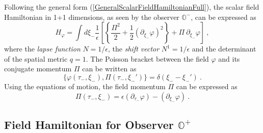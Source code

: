\documentclass[aps,12pt,showpacs]{revtex4-2}
\def\observerminus{\mathbb{O}^{-}}
\def\observerplus{\mathbb{O}^{+}}
\begin{document}
Following the general form (\ref{GeneralScalarFieldHamiltonianFull}),
the scalar field Hamiltonian in 1+1 dimensions, as seen by the observer 
$\observerminus$, can be expressed as
%
\begin{equation}\label{ScalarHamiltonianFullMinus}
H_{\varphi} = \int d\xi_{-}  \frac{1}{\epsilon}  \left[
\left\{ \frac{\Pi^2}{2}  + \frac{1}{2}  (\partial_{\xi_{-}}\varphi)^2 \right\} 
+ \Pi~ \partial_{\xi_{-}} \varphi \right] ~,
\end{equation}
%
where the \emph{lapse function} $N = 1/\epsilon$, the \emph{shift vector} $N^1 = 
1/\epsilon$ and the determinant of the spatial metric $q = 1$. The Poisson 
bracket between the field $\varphi$ and its conjugate momentum $\Pi$ can be 
written as
%
\begin{equation}\label{PoissonBracketMinus}
\{\varphi(\tau_{-},\xi_{-}), \Pi(\tau_{-},\xi_{-}')\} 
= \delta(\xi_{-} - \xi_{-}') ~.
\end{equation}
%
Using the equations of motion, the field momentum $\Pi$ can be expressed 
as 
%
\begin{equation}\label{FieldMomentumMinus}
\Pi(\tau_{-},\xi_{-}) = \epsilon (\partial_{\tau_{-}}\varphi) - 
(\partial_{\xi_{-}}\varphi) ~.
\end{equation}
%





\subsection{Field Hamiltonian for Observer $\observerplus$}
\end{document}
